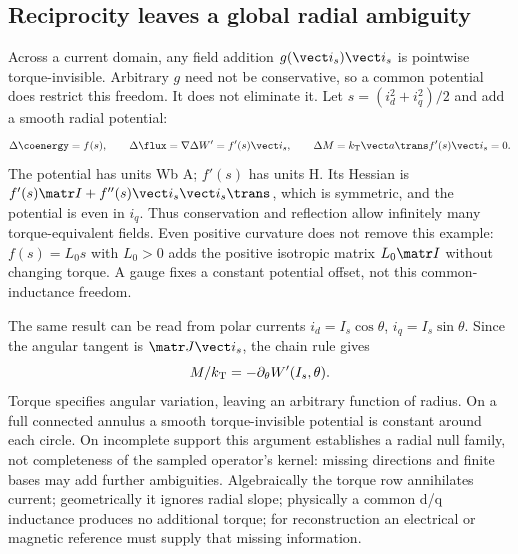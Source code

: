 \subsection{Reciprocity leaves a global radial ambiguity}
\label{sec:torque-reciprocity}
Across a current domain, any field addition $g(\vect i_s)\vect i_s$ is
pointwise torque-invisible. Arbitrary $g$ need not be conservative, so a
common potential does restrict this freedom. It does not eliminate it.
Let $s=(i_d^2+i_q^2)/2$ and add a smooth radial potential:
\begin{equation}
 \Delta\coenergy=f(s),\qquad
 \Delta\flux=\nabla\Delta W'=f'(s)\vect i_s,\qquad
 \Delta M=k_{\rm T}\vect a\trans f'(s)\vect i_s=0.
 \label{eq:radial-potential-null}
\end{equation}
The potential has units Wb A; $f'(s)$ has units H. Its Hessian is
$f'(s)\matr I+f''(s)\vect i_s\vect i_s\trans$, which is symmetric,
and the potential is even in $i_q$. Thus conservation and reflection
allow infinitely many torque-equivalent fields. Even positive curvature
does not remove this example: $f(s)=L_0s$ with $L_0>0$ adds the positive
isotropic matrix $L_0\matr I$ without changing torque. A gauge fixes a
constant potential offset, not this common-inductance freedom.

The same result can be read from polar currents
$i_d=I_s\cos\theta$, $i_q=I_s\sin\theta$. Since the angular tangent is
$\matr J\vect i_s$, the chain rule gives
\begin{equation}
 M/k_{\rm T}=-\partial_\theta W'(I_s,\theta).
 \label{eq:torque-angular-potential}
\end{equation}
Torque specifies angular variation, leaving an arbitrary function of radius.
On a full connected annulus a smooth torque-invisible potential is constant
around each circle. On incomplete support this argument establishes a
radial null family, not completeness of the sampled operator's kernel:
missing directions and finite bases may add further ambiguities.
Algebraically the torque row annihilates current; geometrically it ignores
radial slope; physically a common d/q inductance produces no additional
torque; for reconstruction an electrical or magnetic reference must supply
that missing information.

